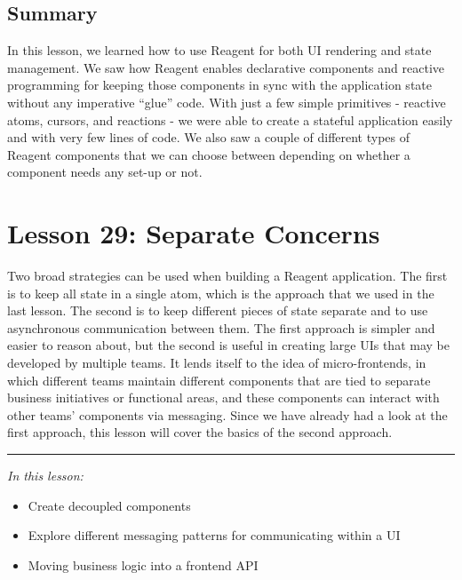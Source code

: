 \documentclass[10pt,twoside,openright]{memoir}
\begin{document}
\section{Summary}

In this lesson, we learned how to use Reagent for both UI rendering and
state management. We saw how Reagent enables declarative components and
reactive programming for keeping those components in sync with the
application state without any imperative ``glue'' code. With just a few
simple primitives - reactive atoms, cursors, and reactions - we were
able to create a stateful application easily and with very few lines of
code. We also saw a couple of different types of Reagent components that
we can choose between depending on whether a component needs any set-up
or not.


\chapter{Lesson 29: Separate Concerns}

Two broad strategies can be used when building a Reagent application.
The first is to keep all state in a single atom, which is the approach
that we used in the last lesson. The second is to keep different pieces
of state separate and to use asynchronous communication between them.
The first approach is simpler and easier to reason about, but the second
is useful in creating large UIs that may be developed by multiple teams.
It lends itself to the idea of micro-frontends, in which different teams
maintain different components that are tied to separate business
initiatives or functional areas, and these components can interact with
other teams' components via messaging. Since we have already had a look
at the first approach, this lesson will cover the basics of the second
approach.

\begin{center}\rule{0.5\linewidth}{0.5pt}\end{center}

\emph{In this lesson:}

\begin{itemize}
\tightlist
\item
  Create decoupled components
\item
  Explore different messaging patterns for communicating within a UI
\item
  Moving business logic into a frontend API
\end{itemize}
\end{document}
